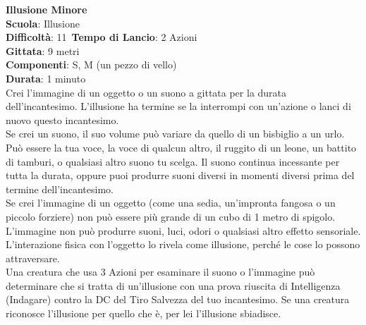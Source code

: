 \begin{multicols}{2}
\medskip\textbf{Illusione Minore}\\
\textbf{Scuola}: Illusione\\
\textbf{Difficoltà}: 11\
\textbf{Tempo di Lancio}: 2 Azioni\\
\textbf{Gittata}: 9 metri\\
\textbf{Componenti}: S, M (un pezzo di vello)\\
\textbf{Durata}: 1 minuto\\
Crei l’immagine di un oggetto o un suono a gittata per la durata dell'incantesimo. L’illusione ha termine se la interrompi con un'azione o lanci di nuovo questo incantesimo.\\
Se crei un suono, il suo volume può variare da quello di un bisbiglio a un urlo. Può essere la tua voce, la voce di qualcun altro, il ruggito di un leone, un battito di tamburi, o qualsiasi altro suono tu scelga. Il suono continua incessante per tutta la durata, oppure puoi produrre suoni diversi in momenti diversi prima del termine dell'incantesimo.\\
Se crei l’immagine di un oggetto (come una sedia, un'impronta fangosa o un piccolo forziere) non può essere più grande di un cubo di 1 metro di spigolo. L’immagine non può produrre suoni, luci, odori o qualsiasi altro effetto sensoriale. L’interazione fisica con l’oggetto lo rivela come illusione, perché le cose lo possono attraversare.\\
Una creatura che usa 3 Azioni per esaminare il suono o l’immagine può determinare che si tratta di un'illusione con una prova riuscita di Intelligenza (Indagare) contro la DC del Tiro Salvezza del tuo incantesimo. Se una creatura riconosce l’illusione per quello che è, per lei l’illusione sbiadisce. 


\end{multicols}
